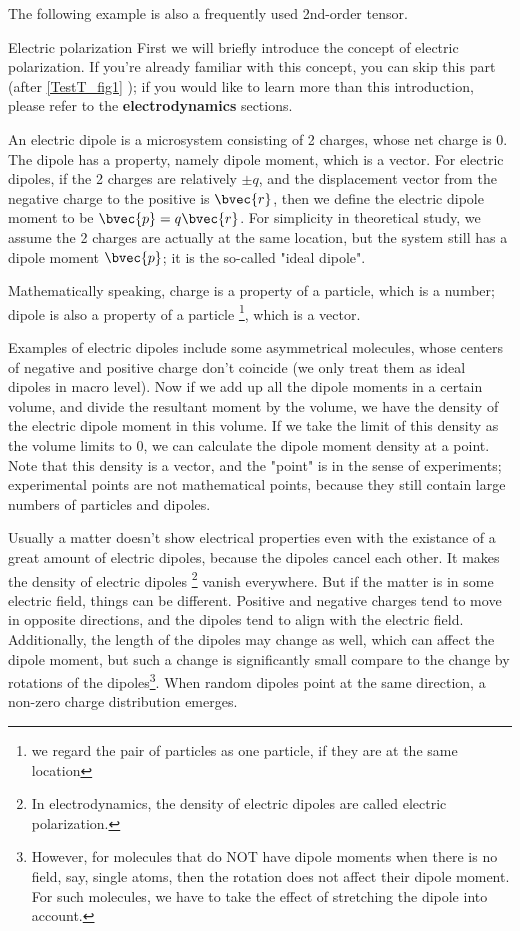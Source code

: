 The following example is also a frequently used 2nd-order tensor. 

\begin{example}{Electric polarization}
First we will briefly introduce the concept of electric polarization. If you're already familiar with this concept, you can skip this part (after \autoref{TestT_fig1} ); if you would like to learn more than this introduction, please refer to the \textbf{electrodynamics} sections. 

An electric dipole is a microsystem consisting of 2 charges, whose net charge is 0. The dipole has a property, namely dipole moment, which is a vector. For electric dipoles, if the 2 charges are relatively $\pm q$, and the displacement vector from the negative charge to the positive is $\bvec{r}$, then we define the electric dipole moment to be $\bvec{p}=q\bvec{r}$. For simplicity in theoretical study, we assume the 2 charges are actually at the same location, but the system still has a dipole moment $\bvec{p}$; it is the so-called "ideal dipole". 

Mathematically speaking, charge is a property of a particle, which is a number; dipole is also a property of a particle \footnote{we regard the pair of particles as one particle, if they are at the same location}, which is a vector. 

Examples of electric dipoles include some asymmetrical molecules, whose centers of negative and positive charge don't coincide (we only treat them as ideal dipoles in macro level). Now if we add up all the dipole moments in a certain volume, and divide the resultant moment by the volume, we have the density of the electric dipole moment in this volume. If we take the limit of this density as the volume limits to 0, we can calculate the dipole moment density at a point. Note that this density is a vector, and the "point" is in the sense of experiments; experimental points are not mathematical points, because they still contain large numbers of particles and dipoles. 

Usually a matter doesn't show electrical properties even with the existance of a great amount of electric dipoles, because the dipoles cancel each other. It makes the density of electric dipoles \footnote{In electrodynamics, the density of electric dipoles are called electric polarization. } vanish everywhere. But if the matter is in some electric field, things can be different. Positive and negative charges tend to move in opposite directions, and the dipoles tend to align with the electric field. Additionally, the length of the dipoles may change as well, which can affect the dipole moment, but such a change is significantly small compare to the change by rotations of the dipoles\footnote{However, for molecules that do NOT have dipole moments when there is no field, say, single atoms, then the rotation does not affect their dipole moment. For such molecules, we have to take the effect of stretching the dipole into account. }. When random dipoles point at the same direction, a non-zero charge distribution emerges. 





\end{example}
